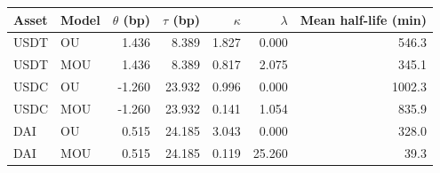 \begin{tabular}{llrrrrr}
\toprule
Asset & Model & $\theta$ (bp) & $\tau$ (bp) & $\kappa$ & $\lambda$ & Mean half-life (min)\\
\midrule
USDT & OU & 1.436 & 8.389 & 1.827 & 0.000 & 546.3 \tabularnewline
USDT & MOU & 1.436 & 8.389 & 0.817 & 2.075 & 345.1 \tabularnewline
USDC & OU & -1.260 & 23.932 & 0.996 & 0.000 & 1002.3 \tabularnewline
USDC & MOU & -1.260 & 23.932 & 0.141 & 1.054 & 835.9 \tabularnewline
DAI & OU & 0.515 & 24.185 & 3.043 & 0.000 & 328.0 \tabularnewline
DAI & MOU & 0.515 & 24.185 & 0.119 & 25.260 & 39.3 \tabularnewline
\bottomrule
\end{tabular}
